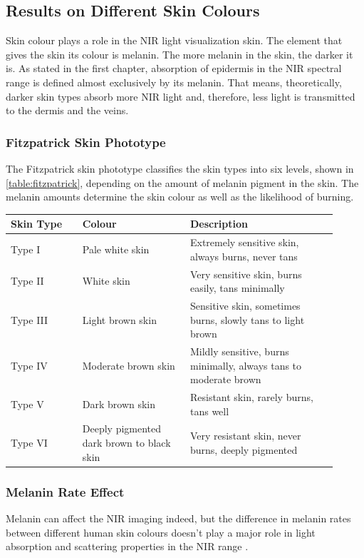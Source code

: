 \subsection{Results on Different Skin Colours} 

Skin colour plays a role in the NIR light visualization skin. The element that gives the skin its colour is melanin. The more melanin in the skin, the darker it is. As stated in the first chapter, absorption of epidermis in the NIR spectral range is defined almost exclusively by its melanin. That means, theoretically, darker skin types absorb more NIR light and, therefore, less light is transmitted to the dermis and the veins. 


\subsubsection{Fitzpatrick Skin Phototype}

The Fitzpatrick skin phototype classifies the skin types into six levels, shown in \autoref{table:fitzpatrick}, depending on the amount of melanin pigment in the skin. The melanin amounts determine the skin colour as well as the likelihood of burning.

\begin{table}[H]
\setlength\extrarowheight{7pt}
\begin{tabular}{ | p{0.2\linewidth} | p{0.3\linewidth}| p{0.41\linewidth} |}
Skin Type&Colour&Description\\ \hline
Type I&Pale white skin&Extremely sensitive skin, always burns, never tans\\ \hline
Type II& White skin&Very sensitive skin, burns easily, tans minimally\\ \hline
Type III&Light brown skin&Sensitive skin, sometimes burns, slowly tans to light brown\\ \hline
Type IV&Moderate brown skin&Mildly sensitive, burns minimally, always tans to moderate brown\\ \hline
Type V&Dark brown skin&Resistant skin, rarely burns, tans well\\ \hline
Type VI&Deeply pigmented dark brown to black skin&Very resistant skin, never burns, deeply pigmented\\ \hline
\end{tabular}
 \label{table:fitzpatrick} 
\end{table}

\subsubsection{Melanin Rate Effect}
Melanin can affect the NIR imaging indeed, but the difference in melanin rates between different human skin colours doesn’t play a major role in light absorption and scattering properties in the NIR range \parencite{skinTypes}. 

